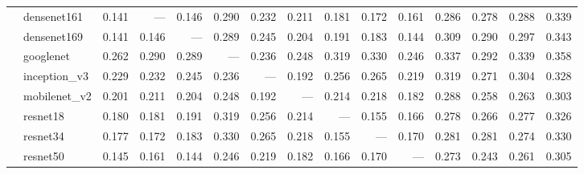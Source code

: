 \begin{table}
\begin{tabular}{llrrrrrrrrrrrrr}
       & densenet161 &                 0.141 &                   --- &                 0.146 &               0.290 &                   0.232 &                   0.211 &              0.181 &              0.172 &              0.161 &               0.286 &               0.278 &               0.288 &               0.339 \\
       & densenet169 &                 0.141 &                 0.146 &                   --- &               0.289 &                   0.245 &                   0.204 &              0.191 &              0.183 &              0.144 &               0.309 &               0.290 &               0.297 &               0.343 \\
       & googlenet &                 0.262 &                 0.290 &                 0.289 &                 --- &                   0.236 &                   0.248 &              0.319 &              0.330 &              0.246 &               0.337 &               0.292 &               0.339 &               0.358 \\
       & inception_v3 &                 0.229 &                 0.232 &                 0.245 &               0.236 &                     --- &                   0.192 &              0.256 &              0.265 &              0.219 &               0.319 &               0.271 &               0.304 &               0.328 \\
       & mobilenet_v2 &                 0.201 &                 0.211 &                 0.204 &               0.248 &                   0.192 &                     --- &              0.214 &              0.218 &              0.182 &               0.288 &               0.258 &               0.263 &               0.303 \\
       & resnet18 &                 0.180 &                 0.181 &                 0.191 &               0.319 &                   0.256 &                   0.214 &                --- &              0.155 &              0.166 &               0.278 &               0.266 &               0.277 &               0.326 \\
       & resnet34 &                 0.177 &                 0.172 &                 0.183 &               0.330 &                   0.265 &                   0.218 &              0.155 &                --- &              0.170 &               0.281 &               0.281 &               0.274 &               0.330 \\
       & resnet50 &                 0.145 &                 0.161 &                 0.144 &               0.246 &                   0.219 &                   0.182 &              0.166 &              0.170 &                --- &               0.273 &               0.243 &               0.261 &               0.305 \\

\end{tabular}
\end{table}
